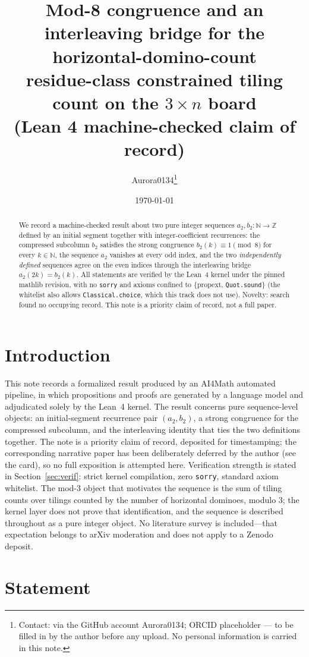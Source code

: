 \documentclass[11pt]{article}
\title{Mod-8 congruence and an interleaving bridge for the horizontal-domino-count\\
 residue-class constrained tiling count on the $3\times n$ board\\
 {\large (Lean 4 machine-checked claim of record)}}
\author{Aurora0134\thanks{Contact: via the GitHub account Aurora0134; ORCID
placeholder --- to be filled in by the author before any upload. No personal
information is carried in this note.}}
\date{\today}
\begin{document}
\maketitle

\begin{abstract}
We record a machine-checked result about two pure integer sequences
$a_2,b_2\colon\mathbb{N}\to\mathbb{Z}$ defined by an initial segment together with
integer-coefficient recurrences: the compressed subcolumn $b_2$ satisfies the strong
congruence $b_2(k)\equiv 1 \pmod 8$ for every $k\in\mathbb{N}$, the sequence $a_2$
vanishes at every odd index, and the two \emph{independently defined} sequences agree on
the even indices through the interleaving bridge $a_2(2k)=b_2(k)$. All statements are
verified by the Lean~4 kernel under the pinned mathlib revision, with no \texttt{sorry}
and axioms confined to \{propext, \texttt{Quot.sound}\} (the whitelist also allows
\texttt{Classical.choice}, which this track does not use). Novelty: search found no
occupying record. This note is a priority claim of record, not a full paper.
\end{abstract}

\section{Introduction}
This note records a formalized result produced by an AI4Math automated pipeline, in which
propositions and proofs are generated by a language model and adjudicated solely by the
Lean~4 kernel. The result concerns pure sequence-level objects: an initial-segment
recurrence pair $(a_2,b_2)$, a strong congruence for the compressed subcolumn, and the
interleaving identity that ties the two definitions together. The note is a priority claim
of record, deposited for timestamping; the corresponding narrative paper has been
deliberately deferred by the author (see the card), so no full exposition is attempted
here. Verification strength is stated in Section~\ref{sec:verif}: strict kernel
compilation, zero \texttt{sorry}, standard axiom whitelist. The mod-3 object that motivates
the sequence is the sum of tiling counts over tilings counted by the number of horizontal
dominoes, modulo 3; the kernel layer does not prove that identification, and the sequence
is described throughout as a pure integer object. No literature survey is
included---that expectation belongs to arXiv moderation and does not apply to a Zenodo
deposit.

\section{Statement}
\end{document}

